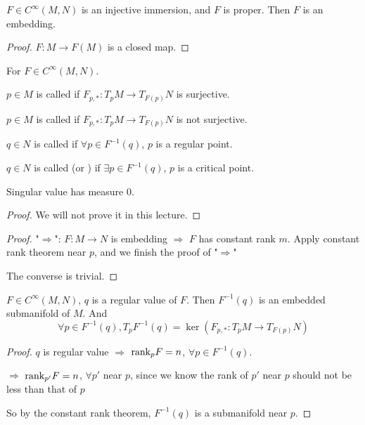\begin{proposition}
     $ F\in C^\infty(M,N)  $ is an injective immersion, and  $ F $ is proper. Then  $ F $ is an embedding.   
\end{proposition}
\begin{proof}
     $ F:M\rightarrow F(M) $ is a closed map. 
\end{proof}
\begin{definition}
    For  $ F\in C^\infty(M,N) $.
    
     $ p\in M $ is called  if  $ F_{p,*}:T_pM\rightarrow T_{F(p)}N $ is surjective.
     
      $ p\in M $ is called  if  $ F_{p,*}:T_pM\rightarrow T_{F(p)}N $ is not surjective. 
     
      $ q \in N$ is called  if  $ \forall p\in F^{-1}(q) $,  $ p $ is a regular point.
      
       $ q\in N $ is called (or ) if  $ \exists p\in F^{-1}(q) $,  $ p $ is a critical point. 
\end{definition}
\begin{theorem}[Sard]
    Singular value has measure  $ 0 $. 
\end{theorem}
\begin{proof}
    We will not prove it in this lecture. 
\end{proof}
\begin{proof}
    "$ \Rightarrow $": $ F:M\rightarrow N $ is embedding  $ \Rightarrow  $ $ F $ has constant rank  $ m $. Apply constant rank theorem near  $ p $, and we finish the proof of  "$\Rightarrow $"

    The converse is trivial.
    
\end{proof}
\begin{theorem}
     $ F\in C^\infty(M,N) $,  $ q $ is a regular value of  $ F $. Then  $ F^{-1}(q) $ is an embedded submanifold of  $ M $. And 
     \[\forall p\in F^{-1}(q),T_pF^{-1}(q)=\ker(F_{p,*}:T_pM\rightarrow T_{F(p)}N)\]     
\end{theorem}
\begin{proof}
     $ q $ is regular value $ \Rightarrow  $ $ \mathrm{rank}_pF=n $, $ \forall p\in F^{-1}(q) $.

      $ \Rightarrow  $ $ \mathrm{rank}_{p'}F=n $,  $ \forall p' $ near  $ p $, since we know  the rank of  $ p' $ near  $ p $ should not be less than that of  $ p $ 
      
      So by the constant rank theorem,  $ F^{-1}(q) $ is a submanifold near  $ p $.  
      
\end{proof}
